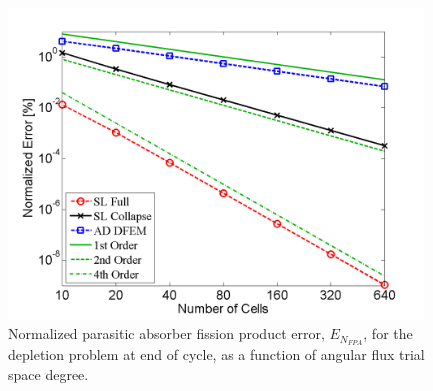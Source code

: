 \begin{figure}[!htp]
\centering
\includegraphics[width=11cm]{chapter5_depletion/FPA_P3_norm_err.png}
\caption{Normalized parasitic absorber fission product error, $E_{N_{FPA}}$, for the depletion problem at end of cycle, as a function of angular flux trial space degree.}
\label{fig:depletion_NFPA_p3}
\end{figure}

